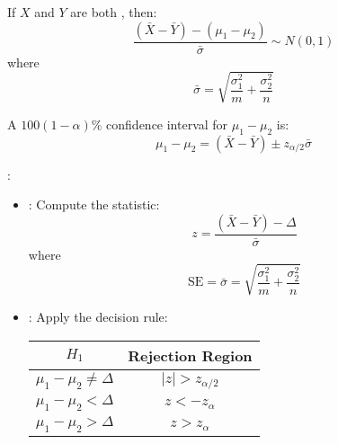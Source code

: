 \begin{multicols}{3}
 \par If $X$ and $Y$ are both , then:
    \[
      \frac{(\bar{X} - \bar{Y}) - (\mu_1 - \mu_2)}{\bar{\sigma}} \sim N(0, 1)
    \]
    where
    \[
      \bar{\sigma} = \sqrt{\frac{\sigma_1^2}{m} + \frac{\sigma_2^2}{n}}
    \]
  \par A $100(1 - \alpha)\%$ confidence interval for $\mu_1 - \mu_2$ is:
    \[
      \mu_1 - \mu_2 = (\bar{X} - \bar{Y}) \pm z_{\alpha/2} \bar{\sigma}
    \]
  \par {}:
    \begin{itemize}
      \item {}: Compute the statistic:
        \[
          z = \frac{(\bar{X} - \bar{Y}) - \Delta}{\bar{\sigma}}
        \]
        where
        \[
          \text{SE} = \bar{\sigma} = \sqrt{\frac{\sigma_1^2}{m} + \frac{\sigma_2^2}{n}}
        \]        
      \item {}: Apply the decision rule:
      \begin{center}
        \begin{tabular}{|c|c|}
          \hline
          \textbf{$H_1$}              & \textbf{Rejection Region} \\ \hline
          $\mu_1 - \mu_2 \neq \Delta$ & $|z| > z_{\alpha/2}$      \\ \hline
          $\mu_1 - \mu_2 < \Delta$    & $z < -z_{\alpha}$         \\ \hline
          $\mu_1 - \mu_2 > \Delta$    & $z > z_{\alpha}$          \\ \hline
        \end{tabular}
      \end{center}
    \end{itemize}


\end{multicols}
